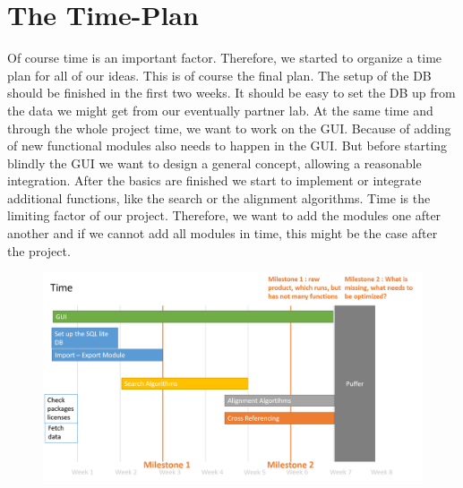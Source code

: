 \documentclass[]{article}
\begin{document}
\section{ The Time-Plan}
Of course time is an important factor. Therefore, we started to organize a time plan for all of our ideas. This is of course the final plan. The setup of the DB should be finished in the first two weeks. It should be easy to set the DB up from the data we might get from our eventually partner lab. At the same time and through the whole project time, we want to work on the GUI. Because of adding of new functional modules also needs to happen in the GUI. But before starting blindly the GUI we want to design a general concept, allowing a reasonable integration. After the basics are finished we start to implement or integrate additional functions, like the search or the alignment algorithms. Time is the limiting factor of our project. Therefore, we want to add the modules one after another and if we cannot add all modules in time, this might be the case after the project.
  
	\begin{figure}[h]
		\includegraphics[width=\textwidth]{img/Time.png}
	\end{figure}
\end{document}
